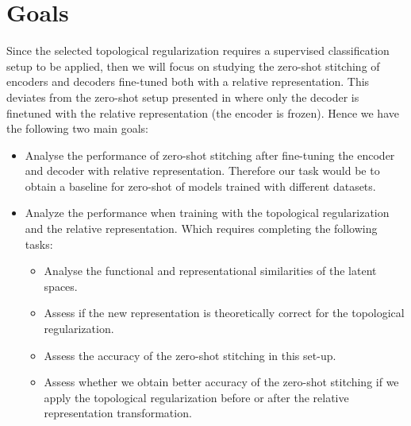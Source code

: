 \documentclass[../main.tex]{subfiles}
\begin{document}
\section{Goals}



Since the selected topological regularization \cite{hofer_densified_2021} requires a supervised classification setup to be applied, then we will focus on studying the zero-shot stitching of encoders and decoders fine-tuned both with a relative representation. This deviates from the zero-shot setup presented in \cite{moschella_relative_2022} where only the decoder is finetuned with the relative representation (the encoder is frozen). Hence we have the following two main goals:

\begin{itemize}
    \item Analyse the performance of zero-shot stitching after fine-tuning the encoder and decoder with relative representation. Therefore our task would be to obtain a baseline for zero-shot of models trained with different datasets.
    
    \item Analyze the performance when training with the topological regularization and the relative representation. Which requires completing the following tasks:

    \begin{itemize}
         \item Analyse the functional and representational similarities of the latent spaces.
         
        \item Assess if the new representation is theoretically correct for the topological regularization.
        
        \item Assess the accuracy of the zero-shot stitching in this set-up.

        \item Assess whether we obtain better accuracy of the zero-shot stitching if we apply the topological regularization before or after the relative representation transformation.
        
    \end{itemize}
\end{itemize}
\end{document}
